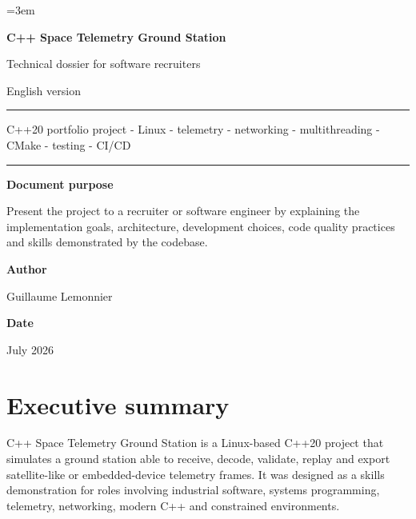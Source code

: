 \documentclass[11pt,a4paper]{article}
\newcommand{\projectname}{C++ Space Telemetry Ground Station}
\begin{document}
\sloppy
\emergencystretch=3em

\begin{titlepage}
    \centering
    \vspace*{1.8cm}
    {\Huge\bfseries\color{primary} \projectname \par}
    \vspace{0.5cm}
    {\Large Technical dossier for software recruiters\par}
    \vspace{1.2cm}
    {\large English version\par}
    \vspace{1.0cm}
    \rule{0.82\linewidth}{0.6pt}\par
    \vspace{0.6cm}
    {\large C++20 portfolio project - Linux - telemetry - networking - multithreading - CMake - testing - CI/CD\par}
    \vspace{0.6cm}
    \rule{0.82\linewidth}{0.6pt}\par
    \vfill
    \begin{flushleft}
    \textbf{Document purpose}\par
    Present the project to a recruiter or software engineer by explaining the implementation goals, architecture, development choices, code quality practices and skills demonstrated by the codebase.\par
    \vspace{0.7cm}
    \textbf{Author}\par
    Guillaume Lemonnier\par
    \vspace{0.3cm}
    \textbf{Date}\par
    July 2026\par
    \end{flushleft}
\end{titlepage}

\tableofcontents
\newpage

\section{Executive summary}

\projectname{} is a Linux-based C++20 project that simulates a ground station able to receive, decode, validate, replay and export satellite-like or embedded-device telemetry frames. It was designed as a skills demonstration for roles involving industrial software, systems programming, telemetry, networking, modern C++ and constrained environments.
\end{document}

